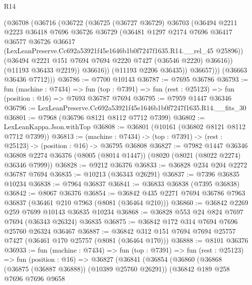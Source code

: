\begin{lexlean}{R14}
\begin{coremodule}
              (@36708
                (@36716
                  (@36722
                    (@36725
                      (@36727 @36729)
                      @36703
                      (@36494
                        @2211
                        @2223
                        @36418
                        @7696
                        @36726
                        @36729
                        (@36481
                          @1297
                          @2174
                          @7696
                          @36417
                          @36577
                          @36726
                          @36617
                          (LexLeanPreserve.Cc692a53921f45e1646b1b0f7247f1635.R14.__rel_45 @25896))
                        (@36494 @2221 @151 @7694 @7694 @2220 @7427 (@36546 @2220) @36616))
                      (@11193 @36433 @2219))
                    @36616))
                (@11193 @2206 @36435))
              @36657)))
        (@36663 @36436 @7712)))
@36786 := @7700 @10143
@36787 := @7695 @36786
@36793 := fun (machine : @7434) =>
  fun (top : @7391) => fun (rest : @25123) => fun (position : @16) => @7693 @36787 @7694
@36795 := @7959 @1447 @36346
@36796 := LexLeanPreserve.Cc692a53921f45e1646b1b0f7247f1635.R14.__fits_30
@36801 := @7968 (@36796 @8121 @8112 @7712 @7399)
@36802 := LexLeanKappa.Json.withTop
@36808 := @36801 (@10161 (@36802 @8121 @8112 @7712 @7399))
@36813 := (machine : @7434) -> (top : @7391) -> (rest : @25123) -> (position : @16) -> @36795 @36808
@36827 := @7982
    @1447
    @36346
    @36808
    @2274
    @36376
    (@8005 (@8014 @1447))
    (@8020 (@8021 (@8022 @2274) @36346 @7999))
@36828 := @9212 @36376
@36833 := @36828 @234 @204 @2272 @36787 @7694
@36835 := @10213 (@36343 @26291)
@36837 := @7396 @36835 @10234
@36838 := @7964 @36837
@36841 := @36833 @36838 (@7395 @36838)
@36842 := @8067 @36376
@36854 := @36842 @435 @2271 @7694 @36786 @7963 @36837 (@36461 @210 @7963 (@8081 (@36464 @210)))
@36860 := @36842 @2269 @259 @7699 @10143 @36835 @10234
@36868 := @36828 @553 @24 @824 @7697 @7694 (@36343 @26324) @36835
@36875 := @36842 @172 @314 @7694 @7696 @25760 @26324 @36467
@36887 := @36842 @312 @151 @7694 @7694 @25757 @7427 (@36461 @170 @25757 (@8081 (@36464 @170)))
@36888 := @8101 @36376
@36933 := fun (machine : @7434) =>
  fun (top : @7391) =>
  fun (rest : @25123) =>
  fun (position : @16) =>
  @36827
    (@36841
      (@36854
        (@36860
          (@36868 (@36875 (@36887 @36888)) (@10389 @25760 @26291))
          (@36842
            @189
            @258
            @7696
            @7696
            @9658

\end{coremodule}
\end{lexlean}

